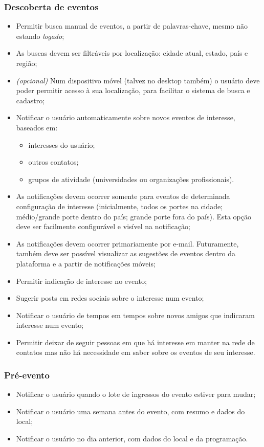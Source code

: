 \documentclass[12pt,a4paper,twoside,hyphens,english,brazil]{abntex2}
\begin{document}
\subsubsection*{Descoberta de eventos}
\begin{itemize}
	\item Permitir busca manual de eventos, a partir de palavras-chave, mesmo não estando \textit{logado};
	\item As buscas devem ser filtráveis por localização: cidade atual, estado, país e região;
	\item \emph{(opcional)} Num dispositivo móvel (talvez no desktop também) o usuário deve poder permitir acesso à sua localização, para facilitar o sistema de busca e cadastro;
	\item Notificar o usuário automaticamente sobre novos eventos de interesse, baseados em:
		\begin{itemize}
			\item interesses do usuário;
			\item outros contatos;
			\item grupos de atividade (universidades ou organizações profissionais).
		\end{itemize}
	\item As notificações devem ocorrer somente para eventos de determinada configuração de interesse (inicialmente, todos os portes na cidade; médio/grande porte dentro do país; grande porte fora do país). Esta opção deve ser facilmente configurável e visível na notificação;
	\item As notificações devem ocorrer primariamente por e-mail. Futuramente, também deve ser possível visualizar as sugestões de eventos dentro da plataforma e a partir de notificações móveis;
	\item Permitir indicação de interesse no evento;
	\item Sugerir posts em redes sociais sobre o interesse num evento;
	\item Notificar o usuário de tempos em tempos sobre novos amigos que indicaram interesse num evento;
	\item Permitir deixar de seguir pessoas em que há interesse em manter na rede de contatos mas não há necessidade em saber sobre os eventos de seu interesse.
\end{itemize}

\subsubsection*{Pré-evento}
\begin{itemize}
	\item Notificar o usuário quando o lote de ingressos do evento estiver para mudar;
	\item Notificar o usuário uma semana antes do evento, com resumo e dados do local;
	\item Notificar o usuário no dia anterior, com dados do local e da programação.
\end{itemize}
\end{document}
